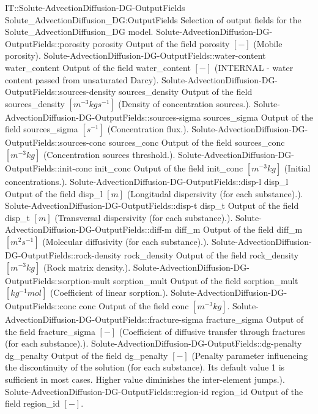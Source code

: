 \begin{SelectionType}
	{IT::Solute-AdvectionDiffusion-DG-OutputFields}
	{Solute{\_}AdvectionDiffusion{\_}DG:OutputFields}
	{{{Selection of output fields for the Solute{\_}AdvectionDiffusion{\_}DG model.}}}
		\SelectionItem
			{Solute-AdvectionDiffusion-DG-OutputFields::porosity}
			{porosity}
			{{{Output of the field porosity }{$[-]$}{ (Mobile porosity).}}}
		\SelectionItem
			{Solute-AdvectionDiffusion-DG-OutputFields::water-content}
			{water{\_}content}
			{{{Output of the field water{\_}content }{$[-]$}{ (INTERNAL - water content passed from unsaturated Darcy).}}}
		\SelectionItem
			{Solute-AdvectionDiffusion-DG-OutputFields::sources-density}
			{sources{\_}density}
			{{{Output of the field sources{\_}density }{$[m^{-3}kgs^{-1}]$}{ (Density of concentration sources.).}}}
		\SelectionItem
			{Solute-AdvectionDiffusion-DG-OutputFields::sources-sigma}
			{sources{\_}sigma}
			{{{Output of the field sources{\_}sigma }{$[s^{-1}]$}{ (Concentration flux.).}}}
		\SelectionItem
			{Solute-AdvectionDiffusion-DG-OutputFields::sources-conc}
			{sources{\_}conc}
			{{{Output of the field sources{\_}conc }{$[m^{-3}kg]$}{ (Concentration sources threshold.).}}}
		\SelectionItem
			{Solute-AdvectionDiffusion-DG-OutputFields::init-conc}
			{init{\_}conc}
			{{{Output of the field init{\_}conc }{$[m^{-3}kg]$}{ (Initial concentrations.).}}}
		\SelectionItem
			{Solute-AdvectionDiffusion-DG-OutputFields::disp-l}
			{disp{\_}l}
			{{{Output of the field disp{\_}l }{$[m]$}{ (Longitudal dispersivity (for each substance).).}}}
		\SelectionItem
			{Solute-AdvectionDiffusion-DG-OutputFields::disp-t}
			{disp{\_}t}
			{{{Output of the field disp{\_}t }{$[m]$}{ (Transversal dispersivity (for each substance).).}}}
		\SelectionItem
			{Solute-AdvectionDiffusion-DG-OutputFields::diff-m}
			{diff{\_}m}
			{{{Output of the field diff{\_}m }{$[m^{2}s^{-1}]$}{ (Molecular diffusivity (for each substance).).}}}
		\SelectionItem
			{Solute-AdvectionDiffusion-DG-OutputFields::rock-density}
			{rock{\_}density}
			{{{Output of the field rock{\_}density }{$[m^{-3}kg]$}{ (Rock matrix density.).}}}
		\SelectionItem
			{Solute-AdvectionDiffusion-DG-OutputFields::sorption-mult}
			{sorption{\_}mult}
			{{{Output of the field sorption{\_}mult }{$[kg^{-1}mol]$}{ (Coefficient of linear sorption.).}}}
		\SelectionItem
			{Solute-AdvectionDiffusion-DG-OutputFields::conc}
			{conc}
			{{{Output of the field conc }{$[m^{-3}kg]$}{.}}}
		\SelectionItem
			{Solute-AdvectionDiffusion-DG-OutputFields::fracture-sigma}
			{fracture{\_}sigma}
			{{{Output of the field fracture{\_}sigma }{$[-]$}{ (Coefficient of diffusive transfer through fractures (for each substance).).}}}
		\SelectionItem
			{Solute-AdvectionDiffusion-DG-OutputFields::dg-penalty}
			{dg{\_}penalty}
			{{{Output of the field dg{\_}penalty }{$[-]$}{ (Penalty parameter influencing the discontinuity of the solution (for each substance). Its default value 1 is sufficient in most cases. Higher value diminishes the inter-element jumps.).}}}
		\SelectionItem
			{Solute-AdvectionDiffusion-DG-OutputFields::region-id}
			{region{\_}id}
			{{{Output of the field region{\_}id }{$[-]$}{.}}}
\end{SelectionType}
